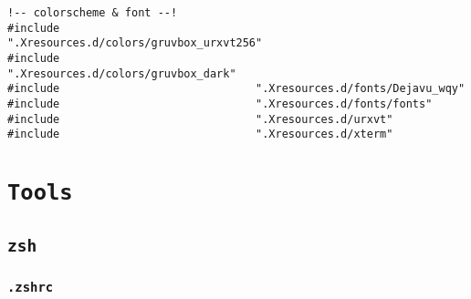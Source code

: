 \documentclass[11pt]{article}
\begin{document}
\begin{enumerate}
\lstset{language=conf-xdefaults,label= ,caption= ,captionpos=b,numbers=none}
\begin{lstlisting}
!-- colorscheme & font --!
#include                              ".Xresources.d/colors/gruvbox_urxvt256"
#include                              ".Xresources.d/colors/gruvbox_dark"
#include                              ".Xresources.d/fonts/Dejavu_wqy"
#include                              ".Xresources.d/fonts/fonts"
#include                              ".Xresources.d/urxvt"
#include                              ".Xresources.d/xterm"
\end{lstlisting}
\end{enumerate}

\section{\texttt{Tools}}
\label{sec:orgabaf4f3}

\subsection{\texttt{zsh}}
\label{sec:org937282a}

\subsubsection{\texttt{.zshrc}}
\label{sec:org8355c88}
\end{document}

